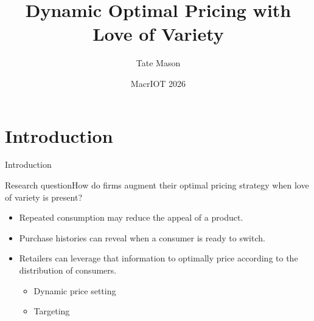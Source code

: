 \documentclass[aspectratio=169,11pt]{beamer}
\title[Dynamic Optimal Pricing]{Dynamic Optimal Pricing with Love of Variety}
\author{Tate Mason}
\date{MacrIOT 2026}
\begin{document}
\begin{frame}[plain]
\titlepage
{}
\end{frame}

\section{Introduction}
\begin{frame}{Introduction}
\begin{block}{Research question}How do firms augment their optimal pricing strategy when love of variety is present?\end{block}
\begin{itemize}
\item Repeated consumption may reduce the appeal of a product.
\item Purchase histories can reveal when a consumer is ready to switch.
\item Retailers can leverage that information to optimally price according to the distribution of consumers.
  \begin{itemize}
    \item Dynamic price setting
    \item Targeting
  \end{itemize}
\end{itemize}
\end{frame}
\end{document}
